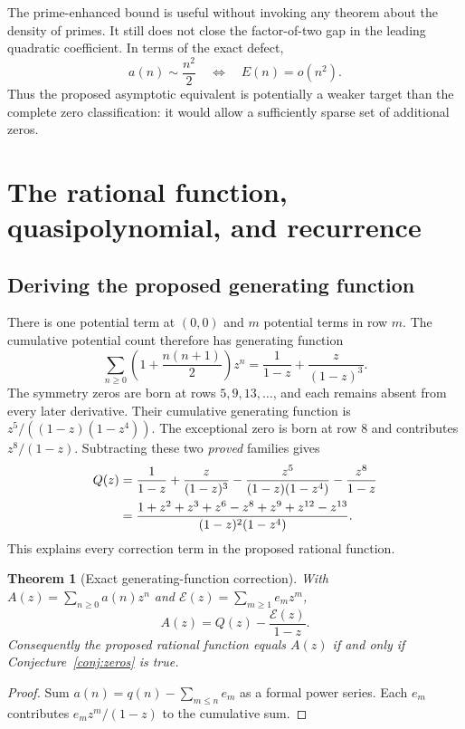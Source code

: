 \documentclass[11pt,a4paper]{article}
\numberwithin{equation}{section}
\newtheorem{theorem}{Theorem}[section]
\theoremstyle{definition}
\theoremstyle{remark}
\begin{document}
The prime-enhanced bound is useful without invoking any theorem about the
density of primes. It still does not close the factor-of-two gap in the
leading quadratic coefficient. In terms of the exact defect,
\begin{equation}\label{eq:asympeq}
 a(n)\sim\frac{n^2}{2}\quad\Longleftrightarrow\quad E(n)=o(n^2).
\end{equation}
Thus the proposed asymptotic equivalent is potentially a weaker target than
the complete zero classification: it would allow a sufficiently sparse set
of additional zeros.

\section{The rational function, quasipolynomial, and recurrence}\label{sec:gf}

\subsection{Deriving the proposed generating function}
There is one potential term at $(0,0)$ and $m$ potential terms in row $m$.
The cumulative potential count therefore has generating function
\[
 \sum_{n\ge0}\left(1+\frac{n(n+1)}2\right)z^n
 =\frac1{1-z}+\frac{z}{(1-z)^3}.
\]
The symmetry zeros are born at rows $5,9,13,\ldots$, and each remains
absent from every later derivative. Their cumulative generating function is
$z^5/((1-z)(1-z^4))$. The exceptional zero is born at row $8$ and
contributes $z^8/(1-z)$. Subtracting these two \emph{proved} families gives
\begin{align}
 Q(z)
 &=\frac1{1-z}+\frac{z}{(1-z)^3}
       -\frac{z^5}{(1-z)(1-z^4)}-\frac{z^8}{1-z}\notag\\
 &=\frac{1+z^2+z^3+z^6-z^8+z^9+z^{12}-z^{13}}
        {(1-z)^2(1-z^4)}.\label{eq:gfderive}
\end{align}
This explains every correction term in the proposed rational function.

\begin{theorem}[Exact generating-function correction]\label{thm:gfdefect}
With $A(z)=\sum_{n\ge0}a(n)z^n$ and
$\mathcal E(z)=\sum_{m\ge1}e_m z^m$,
\begin{equation}\label{eq:gfdefect}
 A(z)=Q(z)-\frac{\mathcal E(z)}{1-z}.
\end{equation}
Consequently the proposed rational function equals $A(z)$ if and only if
Conjecture~\ref{conj:zeros} is true.
\end{theorem}
\begin{proof}
Sum $a(n)=q(n)-\sum_{m\le n}e_m$ as a formal power series. Each $e_m$
contributes $e_mz^m/(1-z)$ to the cumulative sum.
\end{proof}
\end{document}
